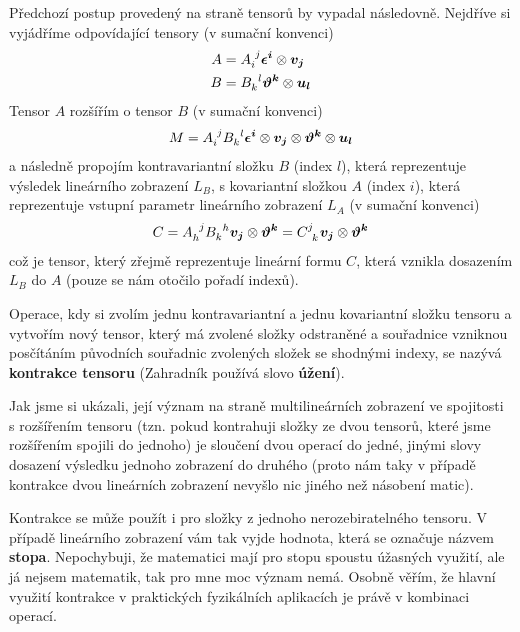 \documentclass[a5paper,12pt]{amsbook}
\theoremstyle{definition}
\newcommand{\myvec}[1]{\bm{#1}}
\begin{document}
Předchozí postup provedený na straně tensorů by vypadal následovně. Nejdříve
si vyjádříme odpovídající tensory (v sumační konvenci)
\begin{equation*}
\begin{split}
A &= A\indices{_i^j} \myvec{\epsilon^i}\otimes\myvec{v_j} \\
B &= B\indices{_k^l} \myvec{\vartheta^k}\otimes\myvec{u_l}
\end{split}
\end{equation*}
Tensor $A$ rozšířím o tensor $B$ (v sumační konvenci)
\begin{equation*}
\begin{split}
M = A\indices{_i^j} B\indices{_k^l}
\myvec{\epsilon^i}\otimes\myvec{v_j}\otimes\myvec{\vartheta^k}\otimes\myvec{u_l}
\end{split}
\end{equation*}
a následně propojím kontravariantní složku $B$ (index $l$), která reprezentuje
výsledek lineárního zobrazení $L_B$, s kovariantní složkou $A$ (index $i$),
která reprezentuje vstupní parametr lineárního zobrazení $L_A$ (v sumační konvenci)
\begin{equation*}
\begin{split}
C = A\indices{_h^j} B\indices{_k^h}\myvec{v_j}\otimes\myvec{\vartheta^k}
  = C\indices{^j_k} \myvec{v_j}\otimes\myvec{\vartheta^k}
\end{split}
\end{equation*}
což je tensor, který zřejmě reprezentuje lineární formu $C$, která vznikla
dosazením $L_B$ do $A$ (pouze se nám otočilo pořadí indexů).

Operace, kdy si zvolím jednu kontravariantní a jednu kovariantní složku
tensoru a vytvořím nový tensor, který má zvolené složky odstraněné a souřadnice
vzniknou posčítáním původních souřadnic zvolených složek se shodnými indexy,
se nazývá \textbf{kontrakce tensoru} (Zahradník používá slovo \textbf{úžení}).

Jak jsme si ukázali, její význam na straně multilineárních zobrazení ve
spojitosti s rozšířením tensoru (tzn. pokud kontrahuji složky ze dvou tensorů,
které jsme rozšířením spojili do jednoho) je sloučení dvou operací do jedné,
jinými slovy dosazení výsledku jednoho zobrazení do druhého (proto nám taky
v případě kontrakce dvou lineárních zobrazení nevyšlo nic jiného než násobení
matic).

Kontrakce se může použít i pro složky z jednoho nerozebiratelného tensoru.
V případě lineárního zobrazení vám tak vyjde hodnota, která se označuje názvem
\textbf{stopa}. Nepochybuji, že matematici mají pro stopu spoustu úžasných využití,
ale já nejsem matematik, tak pro mne moc význam nemá. Osobně věřím, že hlavní
využití kontrakce v praktických fyzikálních aplikacích je právě v kombinaci
operací.
\end{document}
